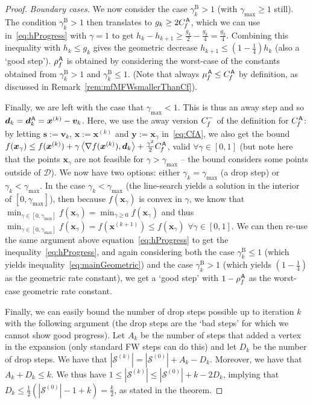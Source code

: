 \documentclass{article} %
\newcommand{\domain}{\mathcal{D}}
\newcommand{\stepsize}{\gamma}
\newcommand{\stepbound}{\stepsize^\textrm{B}} %
\newcommand{\away}{{\hspace{0.06em}\textsf{A}}}
\newcommand{\CfA}{C_{\hspace{-0.08em}f}^-}
\newcommand{\CfMFW}{C_{\hspace{-0.08em}f}^\away}
\newcommand{\strongConvMFW}{\mu_{\hspace{-0.08em}f}^\away}
\newcommand{\x}{\bm{x}}
\newcommand{\y}{\bm{y}}
\newcommand{\s}{\bm{s}}
\newcommand{\dd}{\bm{d}}
\newcommand{\vv}{\bm{v}} %
\newcommand{\Coreset}{\mathcal{S}}
\newcommand{\0}{\mathbf{0}} %
\begin{document}
\begin{proof}
\emph{Boundary cases.} We now consider the case $\stepbound_k > 1$ (with $\stepsize_\textrm{max} \geq 1$ still). The condition $\stepbound_k > 1$ then translates to $g_k \geq 2 \CfMFW$, which we can use in~\eqref{eq:hProgress} with $\stepsize = 1$ to get $h_k - h_{k+1} \geq \frac{g_k}{2} - \frac{g_k}{4} = \frac{g_k}{4}$. Combining this inequality with $h_k \leq g_k$ gives the geometric decrease $h_{k+1} \leq \left(1-\frac{1}{4}\right) h_k$ (also a `good step'). $\rho_f^\away$ is obtained by considering the worst-case of the constants obtained from $\stepbound_k > 1$ and $\stepbound_k \leq 1$. (Note that always $\strongConvMFW \leq \CfMFW$ by definition, as discussed in Remark~\ref{rem:mfMFWsmallerThanCf}).

Finally, we are left with the case that $\stepsize_\textrm{max} < 1$. This is thus an away step and so $\dd_k = \dd_k^\away = \x^{(k)} - \vv_k$. Here, we use the away version $\CfA$ of the definition for $\CfMFW$: by letting $\s := \vv_k$, $\x := \x^{(k)}$ and $\y := \x_\stepsize$ in~\eqref{eq:CfA}, we also get the bound $f(\x_\stepsize) \leq f(\x^{(k)}) + \stepsize \left\langle  \nabla f(\x^{(k)}), \dd_k \right\rangle + \frac{\stepsize^2}{2} \CfMFW$, valid $\forall \stepsize \in [0,1]$ (but note here that the points $\x_\stepsize$ are not feasible for $\stepsize > \stepsize_\textrm{max}$ -- the bound considers some points outside of $\domain$). We now have two options: either $\stepsize_k = \stepsize_\textrm{max}$ (a drop step) or $\stepsize_k < \stepsize_\textrm{max}$. In the case $\stepsize_k < \stepsize_\textrm{max}$ (the line-search yields a solution in the interior of $[0,\stepsize_\textrm{max}]$), then because $f(\x_\stepsize)$ is convex in $\stepsize$, we know that $\min_{\stepsize \in [0,\stepsize_\textrm{max}]} f(\x_\stepsize) = \min_{\stepsize \geq 0} f(\x_\stepsize)$ and thus $\min_{\stepsize \in [0,\stepsize_\textrm{max}]} f(\x_\stepsize) = f(\x^{(k+1)}) \leq f(\x_\stepsize)$ $\forall \stepsize \in [0,1]$. We can then re-use the same argument above equation~\eqref{eq:hProgress} to get the inequality~\eqref{eq:hProgress}, and again considering both the case $\stepbound_k \leq 1$ (which yields inequality~\eqref{eq:mainGeometric}) and the case $\stepbound_k > 1$ (which yields $(1-\frac{1}{4})$ as the geometric rate constant), we get a `good step' with $1-\rho_f^\away$ as the worst-case geometric rate constant.

Finally, we can easily bound the number of drop steps possible up to iteration $k$ with the following argument (the drop steps are the `bad steps' for which we cannot show good progress). Let $A_k$ be the number of steps that added a vertex in the expansion (only standard FW steps can do this) and let $D_k$ be the number of drop steps. We have that $|\Coreset^{(k)}| = |\Coreset^{(0)}| + A_k - D_k$. Moreover, we have that $A_k+D_k \leq k$. We thus have $1 \leq |\Coreset^{(k)}| \leq |\Coreset^{(0)}| + k - 2D_k$, implying that $D_k \leq \frac{1}{2}( |\Coreset^{(0)}|-1+k)=\frac{k}{2}$, as stated in the theorem.
%
%
%
%
%
%
%
%
%
%
%
%
%
%
%
%
%
%
%
%
%
%
\end{proof}
\end{document}

